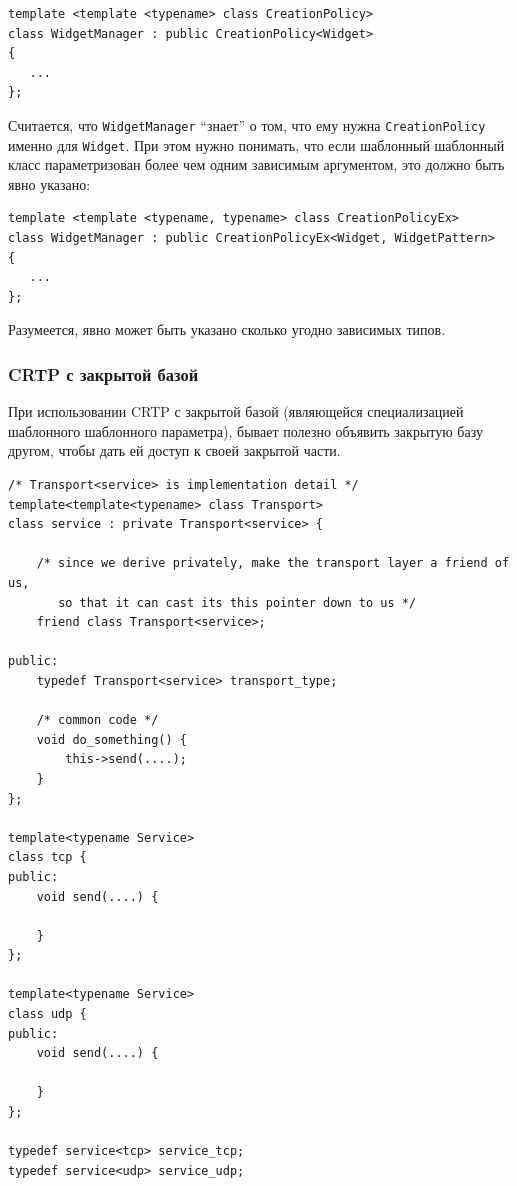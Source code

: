\documentclass[a4paper,12pt,oneside]{article}
\begin{document}
\begin{lstlisting}
template <template <typename> class CreationPolicy>
class WidgetManager : public CreationPolicy<Widget>
{
   ...
};
\end{lstlisting}

Считается, что \lstinline!WidgetManager! ``знает'' о том, что ему нужна \lstinline!CreationPolicy! именно для \lstinline!Widget!. При этом нужно понимать, что если шаблонный шаблонный класс параметризован более чем одним зависимым аргументом, это должно быть явно указано:

\begin{lstlisting}
template <template <typename, typename> class CreationPolicyEx>
class WidgetManager : public CreationPolicyEx<Widget, WidgetPattern>
{
   ...
};
\end{lstlisting}

Разумеется, явно может быть указано сколько угодно зависимых типов.

\subsubsection{CRTP с закрытой базой}

При использовании CRTP с закрытой базой (являющейся специализацией шаблонного шаблонного параметра), бывает полезно объявить закрытую базу другом, чтобы дать ей доступ к своей закрытой части.

\begin{lstlisting}
/* Transport<service> is implementation detail */
template<template<typename> class Transport>
class service : private Transport<service> {

    /* since we derive privately, make the transport layer a friend of us, 
       so that it can cast its this pointer down to us */
    friend class Transport<service>;

public:
    typedef Transport<service> transport_type;

    /* common code */
    void do_something() { 
        this->send(....);
    }
};

template<typename Service>
class tcp {
public:
    void send(....) {

    }
};

template<typename Service>
class udp {
public:
    void send(....) {

    }
};

typedef service<tcp> service_tcp;
typedef service<udp> service_udp;
\end{lstlisting}
\end{document}
